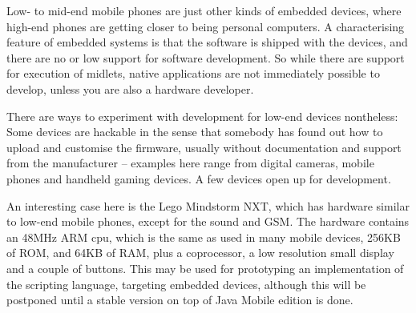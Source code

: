 \documentclass[11pt]{report}
\begin{document}
Low- to mid-end mobile phones are just other kinds of embedded devices, where high-end phones are getting closer to being personal computers.
A characterising feature of embedded systems is that the software is shipped with the devices, and there are no or low support for software development.
So while there are support for execution of midlets, native applications are not immediately possible to develop, unless you are also a hardware developer.

There are ways to experiment with development for low-end devices nontheless:
Some devices are hackable in the sense that somebody has found out how to upload and customise the firmware, usually without documentation and support from the manufacturer -- examples here range from digital cameras, mobile phones and handheld gaming devices.
A few devices open up for development.

An interesting case here is the Lego Mindstorm NXT, which has hardware similar to low-end mobile phones, except for the sound and GSM. 
The hardware contains an 48MHz ARM cpu\cite{arm7tdmi}, which is the same as used in many mobile devices, 256KB of ROM, and 64KB of RAM, plus a coprocessor, a low resolution small display and a couple of buttons. 
This may be used for prototyping an implementation of the scripting language, targeting embedded devices, although this will be postponed until a stable version on top of Java Mobile edition is done.
\end{document}
